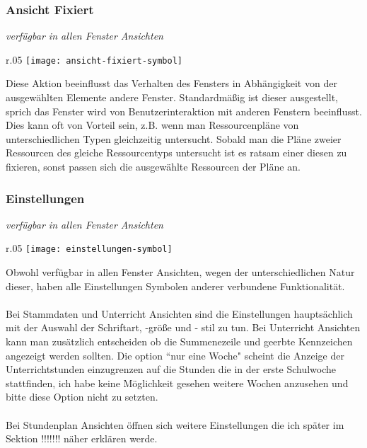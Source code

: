\subsubsection{Ansicht Fixiert}
{\small\textit{verfügbar in allen Fenster Ansichten\\}\par}

\begin{wrapfigure}{r}{.05\textwidth}
	\vspace{-50pt}
	\texttt{[image: ansicht-fixiert-symbol]}
	\vspace{-35pt}
\end{wrapfigure}

\noindent
Diese Aktion beeinflusst das Verhalten des Fensters in Abhängigkeit von der ausgewählten Elemente andere Fenster. Standardmäßig ist dieser ausgestellt, sprich das Fenster wird von Benutzerinteraktion mit anderen Fenstern beeinflusst. Dies kann oft von Vorteil sein, z.B. wenn man Ressourcenpläne von unterschiedlichen Typen gleichzeitig untersucht. Sobald man die Pläne zweier Ressourcen des gleiche Ressourcentyps untersucht ist es ratsam einer diesen zu fixieren, sonst passen sich die ausgewählte Ressourcen der Pläne an.\\

\subsubsection{Einstellungen}
{\small\textit{verfügbar in allen Fenster Ansichten\\}\par}

\begin{wrapfigure}{r}{.05\textwidth}
	\vspace{-50pt}
	\texttt{[image: einstellungen-symbol]}
	\vspace{-35pt}
\end{wrapfigure}

\noindent
Obwohl verfügbar in allen Fenster Ansichten, wegen der unterschiedlichen Natur dieser, haben alle Einstellungen Symbolen anderer verbundene Funktionalität.\\
\\
Bei Stammdaten und Unterricht Ansichten sind die Einstellungen hauptsächlich mit der Auswahl der Schriftart, -größe und - stil zu tun. Bei Unterricht Ansichten kann man zusätzlich entscheiden ob die Summenezeile und geerbte Kennzeichen angezeigt werden sollten. Die option ``nur eine Woche" scheint die Anzeige der Unterrichtstunden einzugrenzen auf die Stunden die in der erste Schulwoche stattfinden, ich habe keine Möglichkeit gesehen weitere Wochen anzusehen und bitte diese Option nicht zu setzten.\\
\\
Bei Stundenplan Ansichten öffnen sich weitere Einstellungen die ich später im Sektion !!!!!!! näher erklären werde.\\



